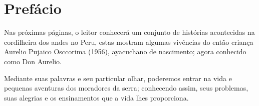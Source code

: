 \cleardoublepage
\newpage
\thispagestyle{empty}
\vfill


\chapter*{Prefácio} %

Nas próximas páginas, o leitor conhecerá um conjunto de histórias acontecidas na cordilheira dos andes no Peru, estas mostram algumas vivências do então criança Aurelio Pujaico Osccorima (1956), %
ayacuchano de nascimento;
agora conhecido como Don Aurelio.

Mediante suas palavras e seu particular olhar, poderemos entrar na vida e pequenas aventuras dos moradores da serra; conhecendo assim, seus problemas, suas alegrias e os ensinamentos que a vida lhes proporciona. 
\vfill

\newpage
\thispagestyle{empty}

